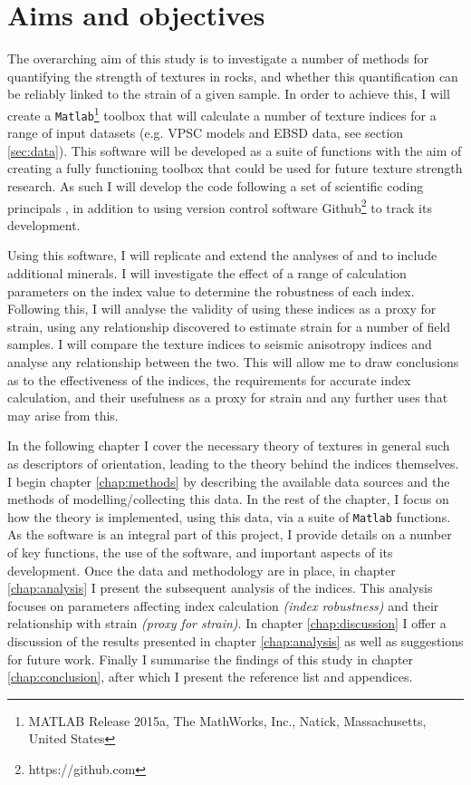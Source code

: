 \documentclass[a4paper,12pt,twoside]{report}
\numberwithin{equation}{chapter}
\begin{document}
\section{Aims and objectives} \label{sec:aims+objs}
	
The overarching aim of this study is to investigate a number of methods for quantifying the strength of textures in rocks, and whether this quantification can be reliably linked to the strain of a given sample. In order to achieve this, I will create a \texttt{Matlab}\footnote{MATLAB Release 2015a, The MathWorks, Inc., Natick, Massachusetts, United States} toolbox that will calculate a number of texture indices for a range of input datasets (e.g. VPSC models and EBSD data, see section \ref{sec:data}). This software will be developed as a suite of functions with the aim of creating a fully functioning toolbox that could be used for future texture strength research. As such I will develop the code following a set of scientific coding principals \citep{Wilson2014}, in addition to using version control software Github\footnote{https://github.com} to track its development.   

Using this software, I will replicate and extend the analyses of \cite{Skemer} and \cite{Mainprice} to include additional minerals. I will investigate the effect of a range of calculation parameters on the index value to determine the robustness of each index. Following this, I will analyse the validity of using these indices as a proxy for strain, using any relationship discovered to estimate strain for a number of field samples. I will compare the texture indices to seismic anisotropy indices and analyse any relationship between the two. This will allow me to draw conclusions as to the effectiveness of the indices, the requirements for accurate index calculation, and their usefulness as a proxy for strain and any further uses that may arise from this.  

In the following chapter I cover the necessary theory of textures in general such as descriptors of orientation, leading to the theory behind the indices themselves. I begin chapter \ref{chap:methods} by describing the available data sources and the methods of modelling/collecting this data. In the rest of the chapter, I focus on how the theory is implemented, using this data, via a suite of \texttt{Matlab} functions. As the software is an integral part of this project, I provide details on a number of key functions, the use of the software, and important aspects of its development. Once the data and methodology are in place, in chapter \ref{chap:analysis} I present the subsequent analysis of the indices. This analysis focuses on parameters affecting index calculation \emph{(index robustness)} and their relationship with strain \emph{(proxy for strain)}. In chapter \ref{chap:discussion} I offer a discussion of the results presented in chapter \ref{chap:analysis} as well as suggestions for future work. Finally I summarise the findings of this study in chapter \ref{chap:conclusion}, after which I present the reference list and appendices.   
\end{document}
